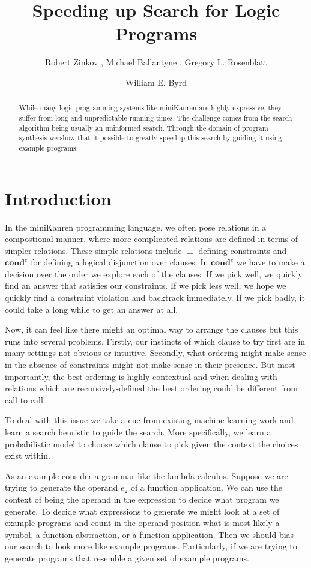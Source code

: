 \documentclass[submission,copyright,creativecommons]{eptcs}
\title{Speeding up Search for Logic Programs}
\author{Robert Zinkov
\institute{University of Oxford \\
Oxford, UK}
\email{zinkov@robots.ox.ac.uk},
Michael Ballantyne
\institute{Northeastern University\\
Boston, MA, USA}
\email{ballantyne.m@husky.neu.edu},
Gregory L. Rosenblatt
\institute{University of Alabama at Birmingham\\
Birmingham, AL, USA}
\email{gregr@uab.edu}
\and
William E. Byrd
\institute{University of Alabama at Birmingham\\
Birmingham, AL, USA}
\email{webyrd@uab.edu}
}
\begin{document}
\maketitle

\begin{abstract}
  While many logic programming systems like miniKanren are highly
  expressive, they suffer from long and unpredictable running times.
  The challenge comes from the search algorithm being usually an
  uninformed search. Through the domain of program synthesis
  we show that it possible to greatly speedup this search by guiding
  it using example programs.
  
\end{abstract}

\section{Introduction}

In the miniKanren\cite{byrd2017unified} programming language, we often
pose relations in a compostional manner, where more complicated
relations are defined in terms of simpler relations. These simple
relations include $\equiv$ defining constraints and $\textbf{cond}^e$
for defining a logical disjunction over clauses. In $\textbf{cond}^e$
we have to make a decision over the order we explore each of the
clauses. If we pick well, we quickly find an answer that satisfies our
constraints. If we pick less well, we hope we quickly find a
constraint violation and backtrack immediately. If we pick badly, it
could take a long while to get an answer at all.

Now, it can feel like there might an optimal way to arrange the
clauses but this runs into several problems. Firstly, our instincts of
which clause to try first are in many settings not obvious or intuitive. Secondly,
what ordering might make sense in the absence of constraints might not make
sense in their presence. But most importantly, the best ordering is highly
contextual and when dealing with relations which are recursively-defined
the best ordering could be different from call to call.

To deal with this issue we take a cue from existing machine learning
work\cite{zaremba2014learning,lee2018accelerating} and learn a search
heuristic to guide the search. More specifically, we learn a
probabilistic model to choose which clause to pick given the context the
choices exist within.

As an example consider a grammar like the lambda-calculus. Suppose we
are trying to generate the operand $e_2$ of a function application. We
can use the context of being the operand in the expression to decide
what program we generate. To decide what expressions to generate we
might look at a set of example programs and count in the operand
position what is most likely a symbol, a function abstraction, or a
function application. Then we should bias our search to look more like
example programs. Particularly, if we are trying to generate programs
that resemble a given set of example programs.
\end{document}
